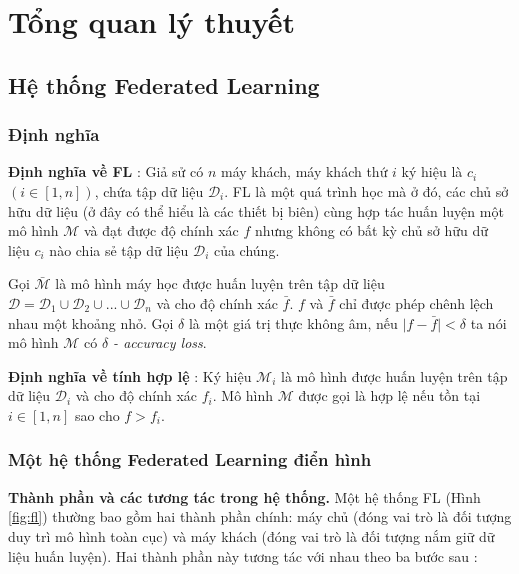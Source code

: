 \chapter{Tổng quan lý thuyết}
\label{Chapter2}

\section{Hệ thống Federated Learning}


\subsection{Định nghĩa}

\textbf{Định nghĩa về FL} \cite{yang2019federated}: Giả sử có $n$ máy khách, máy khách thứ $i$ ký hiệu là $c_i$ $(i\in [1, n])$, chứa tập dữ liệu $\mathcal{D}_i$. FL là một quá trình học mà ở đó, các chủ sở hữu dữ liệu (ở đây có thể hiểu là các thiết bị biên) cùng hợp tác huấn luyện một mô hình $\mathcal{M}$ và đạt được độ chính xác $f$ nhưng không có bất kỳ chủ sở hữu dữ liệu $c_i$ nào chia sẻ tập dữ liệu $\mathcal{D}_i$ của chúng.

Gọi $\bar{\mathcal{M}}$ là mô hình máy học được huấn luyện trên tập dữ liệu $\mathcal{D}  = \mathcal{D}_1 \cup \mathcal{D}_2 \cup ... \cup \mathcal{D}_n$ và cho độ chính xác $\bar{f}$. $f$ và $\bar{f}$ chỉ được phép chênh lệch nhau một khoảng nhỏ. Gọi $\delta$ là một giá trị thực không âm, nếu $\mid f-\bar{f}\mid < \delta$ ta nói mô hình $\mathcal{M}$ có \textit{$\delta$ - accuracy loss}.

\textbf{Định nghĩa về tính hợp lệ} \cite{li2021survey}: Ký hiệu $\mathcal{M}_i$ là mô hình được huấn luyện trên tập dữ liệu $\mathcal{D}_i$ và cho độ chính xác $f_i$. Mô hình $\mathcal{M}$ được gọi là hợp lệ nếu tồn tại $i\in [1,n]$ sao cho $f>f_i$.

\subsection{Một hệ thống Federated Learning điển hình}

\textbf{Thành phần và các tương tác trong hệ thống.} Một hệ thống FL (Hình \ref{fig:fl}) thường bao gồm hai thành phần chính: máy chủ (đóng vai trò là đối tượng duy trì mô hình toàn cục) và máy khách (đóng vai trò là đối tượng nắm giữ dữ liệu huấn luyện). Hai thành phần này tương tác với nhau theo ba bước sau \cite{lim2020federated}:

